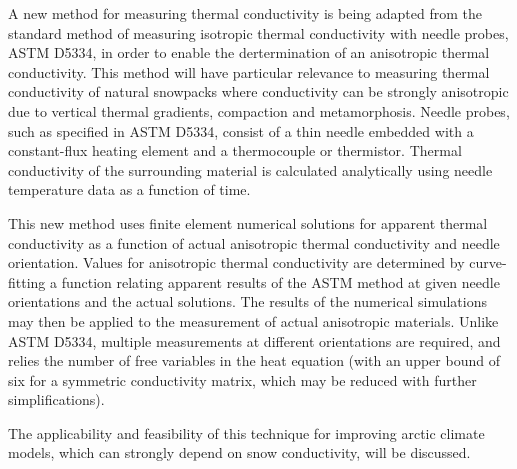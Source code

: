 A new method for measuring thermal conductivity is being adapted from the
standard method of measuring isotropic thermal conductivity with needle probes,
ASTM D5334, in order to enable the dertermination of an anisotropic thermal
conductivity. This method will have particular relevance to measuring thermal
conductivity of natural snowpacks where conductivity  can be strongly
anisotropic due to vertical thermal gradients, compaction and metamorphosis.
Needle probes, such as specified in ASTM D5334, consist of a thin needle
embedded with a constant-flux heating element and a thermocouple or thermistor.
Thermal conductivity of the surrounding material is calculated analytically
using needle temperature data as a function of time.

This new method uses finite element numerical solutions for apparent thermal
conductivity as a function of actual anisotropic thermal conductivity and needle
orientation. Values for anisotropic thermal conductivity are determined by
curve-fitting a function relating apparent results of the ASTM method at given
needle orientations and the actual solutions. The results of the numerical
simulations may then be applied to the measurement of actual anisotropic
materials. Unlike ASTM D5334, multiple measurements at different orientations
are required, and relies the number of free variables in the heat equation
(with an upper bound of six for a symmetric conductivity matrix, which may be
reduced with further simplifications).

The applicability and feasibility of this technique for improving arctic climate
models, which can strongly depend on snow conductivity, will be discussed.
